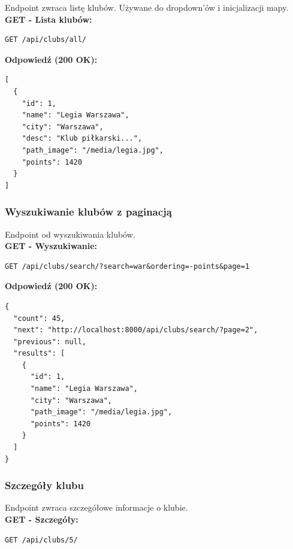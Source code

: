 \documentclass[a4paper,12pt]{article}
\begin{document}
Endpoint zwraca listę klubów. Używane do dropdown'ów i inicjalizacji mapy. \\

\textbf{GET - Lista klubów:}
\begin{lstlisting}
GET /api/clubs/all/
\end{lstlisting}

\vspace{0.5cm}

\textbf{Odpowiedź (200 OK):}
\begin{lstlisting}
[
  {
    "id": 1,
    "name": "Legia Warszawa",
    "city": "Warszawa",
    "desc": "Klub piłkarski...",
    "path_image": "/media/legia.jpg",
    "points": 1420
  }
]
\end{lstlisting}

\newpage

\subsubsection{Wyszukiwanie klubów z paginacją}

Endpoint od wyszukiwania klubów. \\

\textbf{GET - Wyszukiwanie:}
\begin{lstlisting}
GET /api/clubs/search/?search=war&ordering=-points&page=1
\end{lstlisting}

\vspace{0.5cm}

\textbf{Odpowiedź (200 OK):}
\begin{lstlisting}
{
  "count": 45,
  "next": "http://localhost:8000/api/clubs/search/?page=2",
  "previous": null,
  "results": [
    {
      "id": 1,
      "name": "Legia Warszawa",
      "city": "Warszawa",
      "path_image": "/media/legia.jpg",
      "points": 1420
    }
  ]
}
\end{lstlisting}

\newpage

\subsubsection{Szczegóły klubu}

Endpoint zwraca szczegółowe informacje o klubie. \\

\textbf{GET - Szczegóły:}
\begin{lstlisting}
GET /api/clubs/5/
\end{lstlisting}
\end{document}
